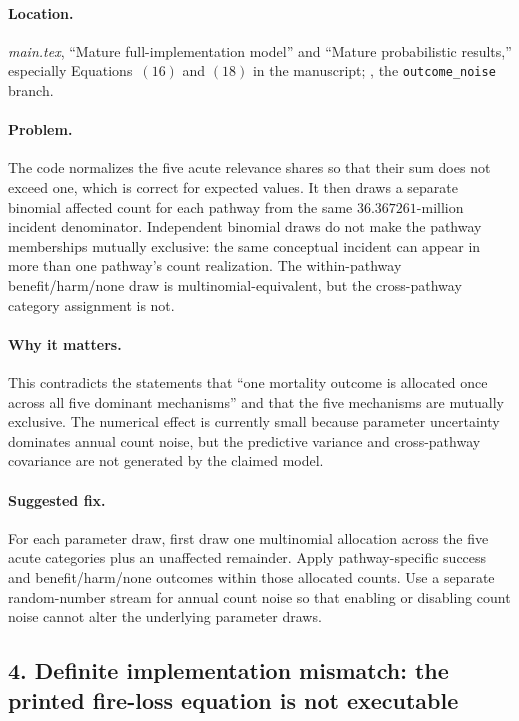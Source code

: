 \documentclass[11pt]{article}
\begin{document}
\paragraph{Location.}
\emph{main.tex}, ``Mature full-implementation model'' and ``Mature
probabilistic results,'' especially Equations~\((16)\) and \((18)\) in the
manuscript; , the
\texttt{outcome\_noise} branch.

\paragraph{Problem.}
The code normalizes the five acute relevance shares so that their sum does not
exceed one, which is correct for expected values.  It then draws a separate
binomial affected count for each pathway from the same
\(36.367261\)-million incident denominator.  Independent binomial draws do not
make the pathway memberships mutually exclusive: the same conceptual incident
can appear in more than one pathway's count realization.  The within-pathway
benefit/harm/none draw is multinomial-equivalent, but the cross-pathway category
assignment is not.

\paragraph{Why it matters.}
This contradicts the statements that ``one mortality outcome is allocated once
across all five dominant mechanisms'' and that the five mechanisms are
mutually exclusive.  The numerical effect is currently small because parameter
uncertainty dominates annual count noise, but the predictive variance and
cross-pathway covariance are not generated by the claimed model.

\paragraph{Suggested fix.}
For each parameter draw, first draw one multinomial allocation across the five
acute categories plus an unaffected remainder.  Apply pathway-specific success
and benefit/harm/none outcomes within those allocated counts.  Use a separate
random-number stream for annual count noise so that enabling or disabling count
noise cannot alter the underlying parameter draws.

\subsection*{4. Definite implementation mismatch: the printed fire-loss equation is not executable}
\end{document}
